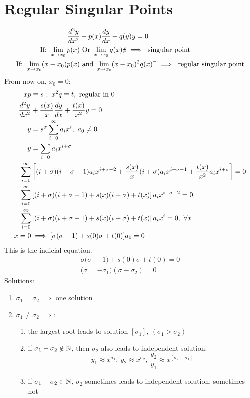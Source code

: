 \documentclass[Maths.tex]{subfiles}
\begin{document}
\section{Regular Singular Points}
\begin{align}
    \frac{d^2 y}{dx^2} &+ p(x)\frac{dy}{dx} + q(y)y = 0 \\
    \text{If: } \lim_{x\to x_0} p(x) &\text{ Or } \lim_{x\to x_0} q(x) \nexists \implies \text{ singular point} \\
    \text{If: } \lim_{x \to x_0} (x-x_0)p(x) &\text{ and } \lim_{x\to x_0} (x-x_0)^2q(x) \exists \implies \text{ regular singular point}
\end{align}
From now on, $x_0 = 0$:
\begin{align}
    xp &\equiv s ~;~ x^2q \equiv t,~ \text{regular in }0 \\
    \frac{d^2 y}{dx^2} &+ \frac{s(x)}{x}\frac{dy}{dx} + \frac{t(x)}{x^2}y = 0 \\
    y &= s^\sigma \sum_{i=0}^\infty a_ix^i,~ a_0 \neq 0 \\
    y &= \sum_{i=0}a_ix^{i+\sigma} \\
    \sum_{i=0}^\infty &\left[(i+\sigma)(i+\sigma-1)a_ix^{i+\sigma-2} + \frac{s(x)}{x}(i+\sigma)a_ix^{i+\sigma-1}+ \frac{t(x)}{x^2}a_ix^{i+\sigma}\right] = 0 \\
    \sum_{i=0}^\infty & \left[(i+\sigma)(i+\sigma-1)+s(x)(i+\sigma)+t(x)\right]a_ix^{i+\sigma-2} = 0 \\
    \sum_{i=0}^\infty & \left[(i+\sigma)(i+\sigma-1) + s(x)(i+\sigma)+t(x)\right]a_ix^i = 0,~ \forall x \\
    x = 0 &\implies [\sigma(\sigma-1) + s(0)\sigma + t(0)]a_0 = 0
\end{align}
This is the indicial equation.
\begin{align}
    \sigma(\sigma &- 1) + s(0)\sigma + t(0) = 0 \\
    (\sigma &- \sigma_1)(\sigma - \sigma_2) = 0
\end{align}
Solutions:
\begin{enumerate}
    \item $\sigma_1 = \sigma_2 \implies$ one solution
    \item $\sigma_1 \neq \sigma_2 \implies$:
    \begin{enumerate}
        \item the largest root leads to solution $[\sigma_1],~ (\sigma_1 > \sigma_2)$
        \item if $\sigma_1 - \sigma_2 \notin \mathbb{N}$, then $\sigma_2$ also leads to independent solution:
        \begin{equation}
            y_1 \approx x^{\sigma_1},~ y_2 \approx x^{\sigma_2},~ \frac{y_2}{y_1} \approx x^{[\sigma_2 - \sigma_1]}
        \end{equation}
        \item if $\sigma_1 - \sigma_2 \in \mathbb{N}$, $\sigma_2$ sometimes leads to independent solution, sometimes not
    \end{enumerate}
\end{enumerate}
\end{document}
